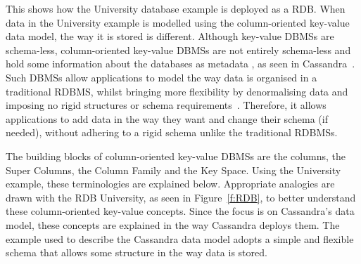 This shows how the University database example is deployed as a \ac{RDB}.  When
data in the University example is modelled using the column-oriented key-value
data model,   the way it is stored is different.
Although key-value \acp{DBMS} are schema-less,   column-oriented key-value
\acp{DBMS} are not entirely schema-less and hold some information about the
databases as metadata , as seen in Cassandra~\citep{datastaxDataModel}.
Such \acp{DBMS} allow applications to model the way data is organised in a
traditional \ac{RDBMS}, whilst bringing more flexibility by denormalising data
and imposing no rigid structures or schema
requirements~\citep{cassandra,BOOK,datastaxDataModel}.
Therefore,   it allows applications to add data in the way they want and change
their schema (if needed),   without adhering to a rigid schema unlike the
traditional \acp{RDBMS}.

The building blocks of column-oriented key-value \acp{DBMS} are the columns,  
the Super Columns,   the Column Family and the Key Space.  Using the
University example,   these terminologies are explained below. 
Appropriate analogies are drawn with the \ac{RDB} University,   as
seen in Figure~\ref{f:RDB}, to better understand these column-oriented key-value
concepts.  Since the focus is on Cassandra's data model,   these concepts
are explained in the way Cassandra deploys them.  The example used
to describe the Cassandra data model adopts a simple and flexible schema that
allows some structure in the way data is stored. 

